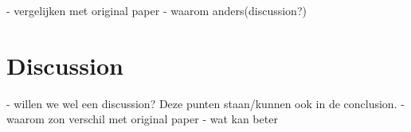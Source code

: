 \documentclass[runningheads]{llncs}
\begin{document}
- vergelijken met original paper
- waarom anders(discussion?)




\section{Discussion}
- willen we wel een discussion? Deze punten staan/kunnen ook in de conclusion.
- waarom zon verschil met original paper
- wat kan beter




\end{document}
